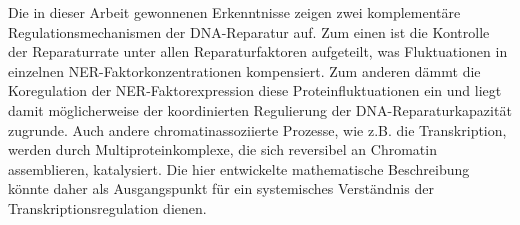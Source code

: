 Die in dieser Arbeit gewonnenen Erkenntnisse zeigen zwei komplement\"{a}re Re\-gulationsmechanismen der DNA-Reparatur auf. Zum einen ist die Kontrolle der Reparaturrate unter allen Reparaturfaktoren aufgeteilt, was Fluktuationen in einzelnen NER-Faktorkonzentrationen kompensiert. Zum anderen d\"{a}mmt die Koregulation der NER-Faktorexpression diese Proteinfluktuationen ein und liegt damit m\"{o}glicherweise der koordinierten Regulierung der DNA-Reparaturkapazit\"{a}t zugrunde. Auch andere chromatin\-assoziierte Prozesse, wie z.B. die Transkription, werden durch Multiproteinkomplexe, die sich reversibel an Chromatin assemblieren, katalysiert. Die hier entwickelte mathemati\-sche Beschreibung k\"{o}nnte daher als Ausgangspunkt f\"{u}r ein systemisches Verst\"{a}ndnis der Transkriptionsregulation dienen.




  




